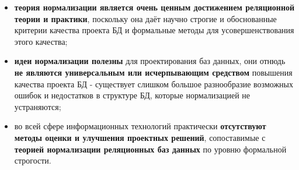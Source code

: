 \documentclass{beamer}
\begin{document}
\begin{frame}
\begin{itemize}
\item \textbf{теория нормализации является очень ценным достижением реляционной теории и практики}, поскольку она даёт научно строгие и обоснованные критерии качества проекта БД и формальные методы для усовершенствования этого качества;
\item \textbf{идеи нормализации полезны} для проектирования баз данных, они отнюдь \textbf{не являются универсальным или исчерпывающим средством} повышения качества проекта БД - существует слишком большое разнообразие возможных ошибок и недостатков в структуре БД, которые нормализацией не устраняются;
\item во всей сфере информационных технологий практически \textbf{отсутствуют методы оценки и улучшения проектных решений}, сопоставимые с \textbf{теорией нормализации реляционных баз данных} по уровню формальной строгости.
\end{itemize}
\end{frame} 
\end{document}
